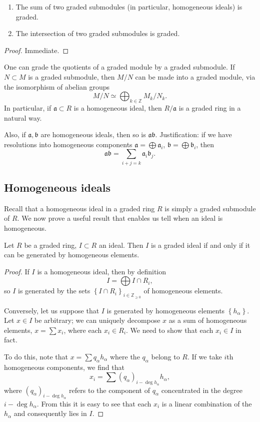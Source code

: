 \begin{lemma} 
\begin{enumerate}
\item  The sum of two graded submodules (in particular, homogeneous ideals) is graded.
\item  The intersection of two graded submodules is graded.
\end{enumerate}
\end{lemma} 
\begin{proof} 
Immediate.
\end{proof} 

One can grade the quotients of a graded module by a graded submodule.
If $N \subset M$ is a graded submodule, then $M/N$ can be made into a graded
module,  via the isomorphism of abelian groups
\[  M/N \simeq \bigoplus_{k \in \mathbb{Z}} M_k/N_k.  \]
In particular, if $\mathfrak{a} \subset R$ is a homogeneous ideal, then 
$R/\mathfrak{a}$ is a graded ring in a natural way.



Also, if $\mathfrak{a}, \mathfrak{b}$ are homogeneous ideals, then so is
$\mathfrak{ab}$.  Justification: if we have resolutions into homogeneous
components $\mathfrak{a} = \bigoplus \mathfrak{a}_i$, $\mathfrak{b} = \bigoplus
\mathfrak{b}_i$, then 
\[  \mathfrak{ab} = \sum_{i+j=k} \mathfrak{a}_i \mathfrak{b}_j . \]

\subsection{Homogeneous ideals}

Recall that a homogeneous ideal in a graded ring $R$ is simply a graded
submodule of $R$. We now prove a useful result that enables us tell when an
ideal is homogeneous.

\begin{proposition} 
Let $R$ be a graded ring, $I \subset R$ an ideal. Then $I$ is a graded ideal
if and only if it can be generated by homogeneous elements.
\end{proposition} 
\begin{proof} 
If $I$ is a homogeneous ideal, then by definition
\[ I = \bigoplus I \cap R_i,  \]
so $I$ is generated by the sets $\left\{I \cap R_i\right\}_{i \in
\mathbb{Z}_{\geq 0}}$ of homogeneous elements. 

Conversely, let us suppose that $I$ is generated by homogeneous elements
$\left\{h_\alpha\right\}$. Let $x \in I$ be arbitrary; we can uniquely
decompose $x$ as a sum of homogeneous elements, $x = \sum x_i$, where each
$x_i \in R_i$. We need to show that each $x_i \in I$ in fact.

To do this, note that $x = \sum q_\alpha h_\alpha$ where the $q_\alpha $
belong to $R$. If we take $i$th homogeneous components, we find that
\[ x_i = \sum ( q_{\alpha})_{i - \deg h_\alpha} h_\alpha, \]
where $(q_\alpha)_{i - \deg h_\alpha}$ refers to the component of $q_\alpha$
concentrated in the degree $i - \deg h_\alpha$.
From this it is easy to see that each $x_i$ is a linear combination of the
$h_\alpha$ and consequently lies in $I$.
\end{proof} 

